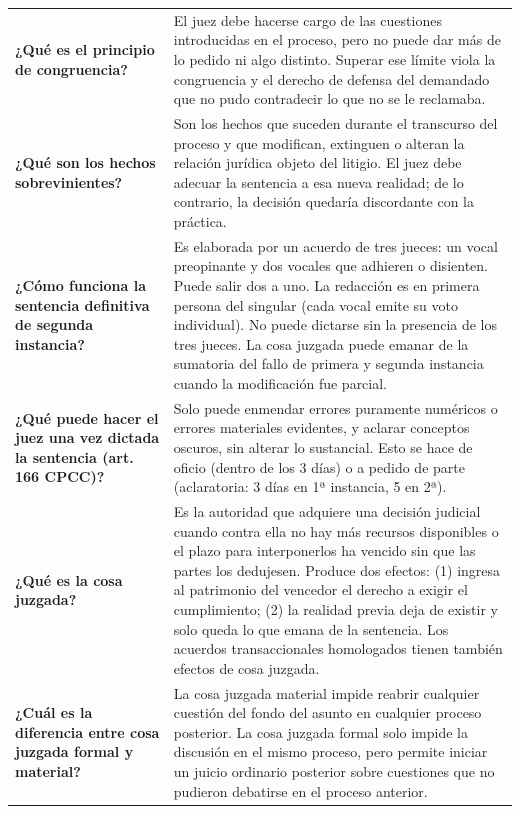 \documentclass[12pt,oneside]{book}
\begin{document}
\begin{table}[H]
\begin{tabularx}{\textwidth}{
    >{\raggedright\arraybackslash}p{}
    >{\raggedright\arraybackslash}X
}
\textbf{¿Qué es el principio de congruencia?} &
El juez debe hacerse cargo de las cuestiones introducidas en el proceso, pero no puede dar más de lo pedido ni algo distinto. Superar ese límite viola la congruencia y el derecho de defensa del demandado que no pudo contradecir lo que no se le reclamaba. \\

\textbf{¿Qué son los hechos sobrevinientes?} &
Son los hechos que suceden durante el transcurso del proceso y que modifican, extinguen o alteran la relación jurídica objeto del litigio. El juez debe adecuar la sentencia a esa nueva realidad; de lo contrario, la decisión quedaría discordante con la práctica. \\

\textbf{¿Cómo funciona la sentencia definitiva de segunda instancia?} &
Es elaborada por un acuerdo de tres jueces: un vocal preopinante y dos vocales que adhieren o disienten. Puede salir dos a uno. La redacción es en primera persona del singular (cada vocal emite su voto individual). No puede dictarse sin la presencia de los tres jueces. La cosa juzgada puede emanar de la sumatoria del fallo de primera y segunda instancia cuando la modificación fue parcial. \\

\textbf{¿Qué puede hacer el juez una vez dictada la sentencia (art. 166 CPCC)?} &
Solo puede enmendar errores puramente numéricos o errores materiales evidentes, y aclarar conceptos oscuros, sin alterar lo sustancial. Esto se hace de oficio (dentro de los 3 días) o a pedido de parte (aclaratoria: 3 días en 1ª instancia, 5 en 2ª). \\

\textbf{¿Qué es la cosa juzgada?} &
Es la autoridad que adquiere una decisión judicial cuando contra ella no hay más recursos disponibles o el plazo para interponerlos ha vencido sin que las partes los dedujesen. Produce dos efectos: (1) ingresa al patrimonio del vencedor el derecho a exigir el cumplimiento; (2) la realidad previa deja de existir y solo queda lo que emana de la sentencia. Los acuerdos transaccionales homologados tienen también efectos de cosa juzgada. \\

\textbf{¿Cuál es la diferencia entre cosa juzgada formal y material?} &
La cosa juzgada material impide reabrir cualquier cuestión del fondo del asunto en cualquier proceso posterior. La cosa juzgada formal solo impide la discusión en el mismo proceso, pero permite iniciar un juicio ordinario posterior sobre cuestiones que no pudieron debatirse en el proceso anterior. \\


\end{tabularx}
\end{table}
\end{document}
